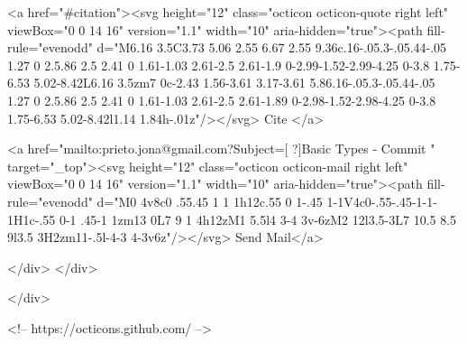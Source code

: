       <a  href="#citation"><svg height="12" class="octicon octicon-quote right left" viewBox="0 0 14 16" version="1.1" width="10" aria-hidden="true"><path fill-rule="evenodd" d="M6.16 3.5C3.73 5.06 2.55 6.67 2.55 9.36c.16-.05.3-.05.44-.05 1.27 0 2.5.86 2.5 2.41 0 1.61-1.03 2.61-2.5 2.61-1.9 0-2.99-1.52-2.99-4.25 0-3.8 1.75-6.53 5.02-8.42L6.16 3.5zm7 0c-2.43 1.56-3.61 3.17-3.61 5.86.16-.05.3-.05.44-.05 1.27 0 2.5.86 2.5 2.41 0 1.61-1.03 2.61-2.5 2.61-1.89 0-2.98-1.52-2.98-4.25 0-3.8 1.75-6.53 5.02-8.42l1.14 1.84h-.01z"/></svg> Cite
      </a>

      <a href="mailto:prieto.jona@gmail.com?Subject=[ ?]Basic Types - Commit " target="_top"><svg height="12" class="octicon octicon-mail right left" viewBox="0 0 14 16" version="1.1" width="10" aria-hidden="true"><path fill-rule="evenodd" d="M0 4v8c0 .55.45 1 1 1h12c.55 0 1-.45 1-1V4c0-.55-.45-1-1-1H1c-.55 0-1 .45-1 1zm13 0L7 9 1 4h12zM1 5.5l4 3-4 3v-6zM2 12l3.5-3L7 10.5 8.5 9l3.5 3H2zm11-.5l-4-3 4-3v6z"/></svg> Send Mail</a>

    </div>
  </div>

</div>

<!-- https://octicons.github.com/ -->





